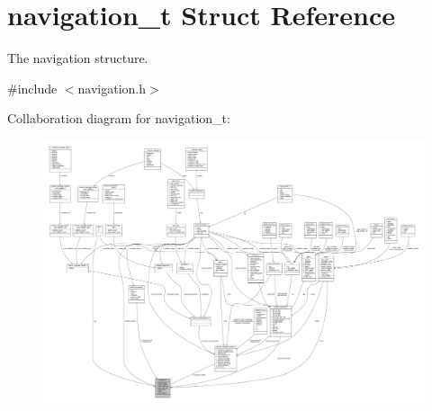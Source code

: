 \hypertarget{structnavigation__t}{\section{navigation\+\_\+t Struct Reference}
\label{structnavigation__t}
}


The navigation structure.  




{\ttfamily \#include $<$navigation.\+h$>$}



Collaboration diagram for navigation\+\_\+t\+:
\nopagebreak
\begin{figure}[H]
\begin{center}
\leavevmode
\includegraphics[width=350pt]{structnavigation__t__coll__graph}
\end{center}
\end{figure}
